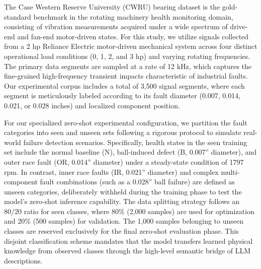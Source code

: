 \documentclass[journal]{IEEEtran}
\begin{document}
The Case Western Reserve University (CWRU) bearing dataset is the gold-standard benchmark in the rotating machinery health monitoring domain, consisting of vibration measurements acquired under a wide spectrum of drive-end and fan-end motor-driven states. For this study, we utilize signals collected from a 2 hp Reliance Electric motor-driven mechanical system across four distinct operational load conditions (0, 1, 2, and 3 hp) and varying rotating frequencies. The primary data segments are sampled at a rate of 12 kHz, which captures the fine-grained high-frequency transient impacts characteristic of industrial faults. Our experimental corpus includes a total of 3,500 signal segments, where each segment is meticulously labeled according to its fault diameter (0.007, 0.014, 0.021, or 0.028 inches) and localized component position. 

For our specialized zero-shot experimental configuration, we partition the fault categories into seen and unseen sets following a rigorous protocol to simulate real-world failure detection scenarios. Specifically, health states in the seen training set include the normal baseline (N), ball-induced defect (B, 0.007'' diameter), and outer race fault (OR, 0.014'' diameter) under a steady-state condition of 1797 rpm. In contrast, inner race faults (IR, 0.021'' diameter) and complex multi-component fault combinations (such as a 0.028'' ball failure) are defined as unseen categories, deliberately withheld during the training phase to test the model's zero-shot inference capability. The data splitting strategy follows an 80/20 ratio for seen classes, where 80\% (2,000 samples) are used for optimization and 20\% (500 samples) for validation. The 1,000 samples belonging to unseen classes are reserved exclusively for the final zero-shot evaluation phase. This disjoint classification scheme mandates that the model transfers learned physical knowledge from observed classes through the high-level semantic bridge of LLM descriptions.
\end{document}
